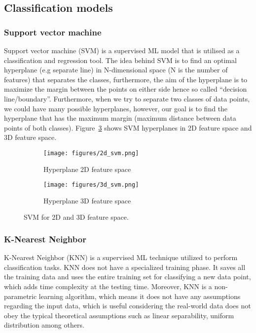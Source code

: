 \subsection{Classification models}
\subsubsection{Support vector machine}
Support vector machine (SVM) is a supervised ML model that is utilised as a classification and regression tool.  
The idea behind SVM is to find an optimal hyperplane (e.g separate line) in N-dimensional space (N is the number of features) that separates the classes, furthermore, the aim of the hyperplane is to maximize the margin between the points on either side hence so called \enquote{decision line/boundary}.
Furthermore, when we try to separate two classes of data points, we could have many possible hyperplanes, however, our goal is to find the hyperplane that has the maximum margin (maximum distance between data points of both classes). 
Figure~\ref{fig:SVM} shows SVM hyperplanes in 2D feature space and 3D feature space.
\begin{figure}[!h]
	\begin{subfigure}[b]{0.49\textwidth}		
		\centering
		\texttt{[image: figures/2d\_svm.png]}
		\caption{Hyperplane 2D feature space } 
		\label{fig:2dsvm}
	\end{subfigure}
	\hfill
	\begin{subfigure}[b]{0.49\textwidth}
		\centering
		\texttt{[image: figures/3d\_svm.png]}
		\caption{Hyperplane 3D feature space} 
		\label{fig:3dsvm}
	\end{subfigure}	
	\caption{SVM for 2D and 3D feature space.}
	\label{fig:SVM}
\end{figure}

\subsubsection{K-Nearest Neighbor}
K-Nearest Neighbor (KNN) is a supervised ML technique utilized to perform classification tasks.
KNN does not have a specialized training phase.
It saves all the training data and uses the entire training set for classifying a new data point, which adds time complexity at the testing time.
Moreover, KNN is a non-parametric learning algorithm, which means it does not have any assumptions regarding the input data, which is useful considering the real-world data does not obey the typical theoretical assumptions such as linear separability, uniform distribution among others.

